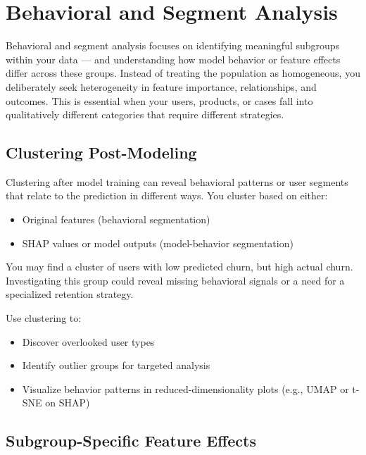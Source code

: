 \documentclass[12pt,openany]{book}
\begin{document}
\chapter{Behavioral and Segment Analysis}

Behavioral and segment analysis focuses on identifying meaningful subgroups within your data — and understanding how model behavior or feature effects differ across these groups. Instead of treating the population as homogeneous, you deliberately seek heterogeneity in feature importance, relationships, and outcomes. This is essential when your users, products, or cases fall into qualitatively different categories that require different strategies.



\section{Clustering Post-Modeling}

Clustering after model training can reveal behavioral patterns or user segments that relate to the prediction in different ways. You cluster based on either:
\begin{itemize}
  \item Original features (behavioral segmentation)
  \item SHAP values or model outputs (model-behavior segmentation)
\end{itemize}

\begin{examplebox}
You may find a cluster of users with low predicted churn, but high actual churn. Investigating this group could reveal missing behavioral signals or a need for a specialized retention strategy.
\end{examplebox}

Use clustering to:
\begin{itemize}
  \item Discover overlooked user types
  \item Identify outlier groups for targeted analysis
  \item Visualize behavior patterns in reduced-dimensionality plots (e.g., UMAP or t-SNE on SHAP)
\end{itemize}



\section{Subgroup-Specific Feature Effects}
\end{document}
